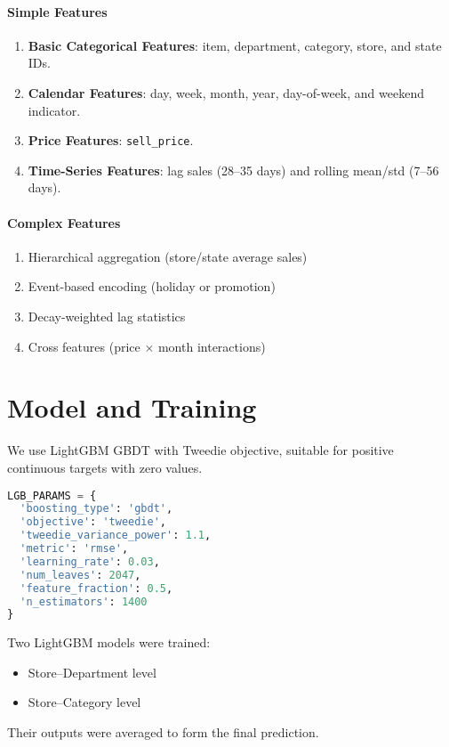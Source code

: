 \documentclass[12pt,a4paper]{article}
\begin{document}
\paragraph{Simple Features}
\begin{enumerate}
  \item \textbf{Basic Categorical Features}: item, department, category, store, and state IDs.
  \item \textbf{Calendar Features}: day, week, month, year, day-of-week, and weekend indicator.
  \item \textbf{Price Features}: \texttt{sell\_price}.
  \item \textbf{Time-Series Features}: lag sales (28–35 days) and rolling mean/std (7–56 days).
\end{enumerate}

\paragraph{Complex Features}
\begin{enumerate}
  \item Hierarchical aggregation (store/state average sales)
  \item Event-based encoding (holiday or promotion)
  \item Decay-weighted lag statistics
  \item Cross features (price × month interactions)
\end{enumerate}

\section{Model and Training}
We use LightGBM GBDT with Tweedie objective, suitable for positive continuous targets with zero values.

\begin{lstlisting}[language=Python]
LGB_PARAMS = {
  'boosting_type': 'gbdt',
  'objective': 'tweedie',
  'tweedie_variance_power': 1.1,
  'metric': 'rmse',
  'learning_rate': 0.03,
  'num_leaves': 2047,
  'feature_fraction': 0.5,
  'n_estimators': 1400
}
\end{lstlisting}

Two LightGBM models were trained:
\begin{itemize}
  \item Store–Department level
  \item Store–Category level
\end{itemize}
Their outputs were averaged to form the final prediction.
\end{document}
